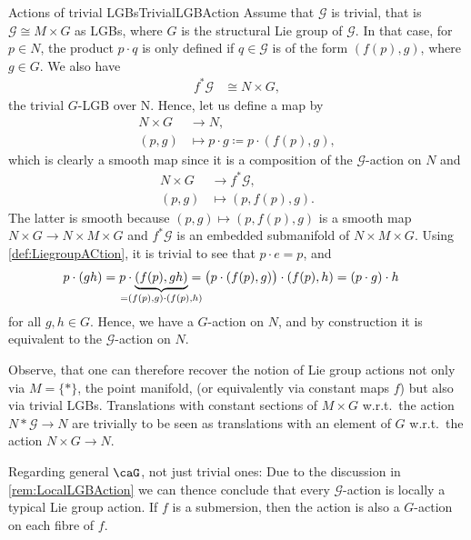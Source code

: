 \documentclass[reqno,a4paper,oneside]{amsart}
\theoremstyle{plain}
\theoremstyle{remark}
\theoremstyle{definition}
\begin{document}
\begin{examples}{Actions of trivial LGBs}{TrivialLGBAction}
Assume that $\mathcal{G}$ is trivial, that is $\mathcal{G} \cong M \times G$ as LGBs, where $G$ is the structural Lie group of $\mathcal{G}$. In that case, for $p \in N$, the product $p \cdot q$ is only defined if $q \in \mathcal{G}$ is of the form $(f(p), g)$, where $g \in G$. We also have
\begin{align*}
f^*\mathcal{G}
&\cong
N \times G,
\end{align*}
the trivial $G$-LGB over N. Hence, let us define a map by
\begin{align*}
N \times G &\to N,\\
(p, g) &\mapsto p \cdot g \coloneqq p \cdot (f(p), g),
\end{align*}
which is clearly a smooth map since it is a composition of the $\mathcal{G}$-action on $N$ and
\begin{align*}
N \times G &\to f^*\mathcal{G},\\
(p, g) &\mapsto (p, f(p), g).
\end{align*}
The latter is smooth because $(p, g) \mapsto (p, f(p), g)$ is a smooth map $N \times G \to N \times M \times G$ and $f^*\mathcal{G}$ is an embedded submanifold of $N \times M \times G$. Using \ref{def:LiegroupACtion}, it is trivial to see that $p \cdot e = p$, and
\begin{align*}
p \cdot (gh)
&=
p \cdot \underbrace{(f(p), gh)}_{\mathclap{= (f(p), g) \cdot (f(p), h)}}
=
\bigl( p \cdot (f(p), g) \bigr) \cdot (f(p), h)
=
(p \cdot g) \cdot h
\end{align*}
for all $g,h \in G$. Hence, we have a $G$-action on $N$, and by construction it is equivalent to the $\mathcal{G}$-action on $N$. 

Observe, that one can therefore recover the notion of Lie group actions not only via $M = \{*\}$, the point manifold, (or equivalently via constant maps $f$) but also via trivial LGBs. Translations with constant sections of $M \times G$ w.r.t.\ the action $N*\mathcal{G}\to N$ are trivially to be seen as translations with an element of $G$ w.r.t.\ the action $N \times G \to N$.

Regarding general $\caG$, not just trivial ones: Due to the discussion in \ref{rem:LocalLGBAction} we can thence conclude that every $\mathcal{G}$-action is locally a typical Lie group action. If $f$ is a submersion, then the action is also a $G$-action on each fibre of $f$.
\end{examples}
\end{document}

